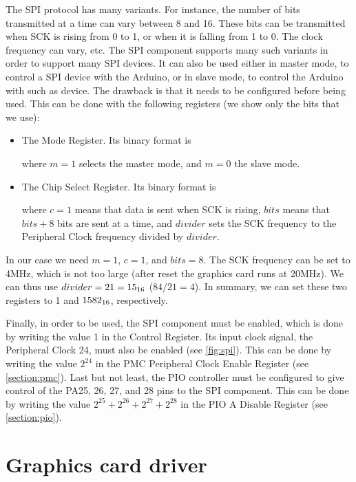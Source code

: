 The SPI protocol has many variants. For instance, the number of bits
transmitted at a time can vary between 8 and 16. These bits can be transmitted
when SCK is rising from 0 to 1, or when it is falling from 1 to 0. The clock
frequency can vary, etc. The SPI component supports many such variants in order
to support many SPI devices. It can also be used either in master mode, to
control a SPI device with the Arduino, or in slave mode, to control the Arduino
with such as device. The drawback is that it needs to be configured before
being used. This can be done with the following registers (we show only the
bits that we use):
\begin{itemize}
  \item The Mode Register. Its binary format is


  where $m=1$ selects the master mode, and $m=0$ the slave mode.

  \item The Chip Select Register. Its binary format is


  where $c=1$ means that data is sent when SCK is rising, $bits$ means that
  $bits+8$ bits are sent at a time, and $divider$ sets the SCK frequency to the
  Peripheral Clock frequency divided by $divider$.
\end{itemize}

In our case we need $m=1$, $c=1$, and $bits=8$. The SCK frequency can be set to
4MHz, which is not too large (after reset the graphics card runs at 20MHz). We
can thus use $divider=21=15_{16}$ ($84/21=4$). In summary, we can set these
two registers to 1 and $1582_{16}$, respectively.

Finally, in order to be used, the SPI component must be enabled, which is done
by writing the value 1 in the Control Register. Its input clock signal, the
Peripheral Clock 24, must also be enabled (see \cref{fig:spi}). This can be
done by writing the value $2^{24}$ in the PMC Peripheral Clock Enable Register
(see \cref{section:pmc}). Last but not least, the PIO controller must be
configured to give control of the PA25, 26, 27, and 28 pins to the SPI
component. This can be done by writing the value $2^{25}+2^{26}+2^{27}+2^{28}$
in the PIO A Disable Register (see \cref{section:pio}).

\section{Graphics card driver}\label{section:gpu-driver}

